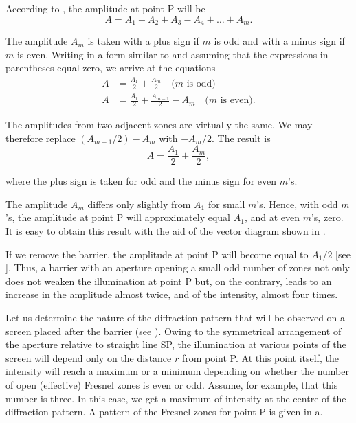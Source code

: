 According to , the amplitude at point P will be
\begin{equation}\label{eq:18_14}
	A = A_1 - A_2 + A_3 - A_4 + \ldots \pm A_m.
\end{equation}

\noindent
The amplitude $A_m$ is taken with a plus sign if $m$ is odd and with a minus sign if $m$ is even.
Writing  in a form similar to  and assuming that the expressions in parentheses equal zero, we arrive at the equations
\begin{align*}
	A &= \frac{A_1}{2} + \frac{A_m}{2} \quad \text{($m$ is odd)}\\
	A &= \frac{A_1}{2} + \frac{A_{m-1}}{2} - A_m \quad \text{($m$ is even)}.
\end{align*}

\noindent
The amplitudes from two adjacent zones are virtually the same.
We may therefore replace $(A_{m-1}/2)-A_m$ with $-A_m/2$.
The result is
\begin{equation}\label{eq:18_15}
	A = \frac{A_1}{2} \pm \frac{A_m}{2},
\end{equation}

\noindent
where the plus sign is taken for odd and the minus sign for even $m$'s.

The amplitude $A_m$ differs only slightly from $A_1$ for small $m$'s.
Hence, with odd $m$'s, the amplitude at point P will approximately equal $A_1$, and at even $m$'s, zero.
It is easy to obtain this result with the aid of the vector diagram shown in .

If we remove the barrier, the amplitude at point P will become equal to $A_1/2$ [see ].
Thus, a barrier with an aperture opening a small odd number of zones not only does not weaken the illumination at point P but, on the contrary, leads to an increase in the amplitude almost twice, and of the intensity, almost four
times.

Let us determine the nature of the diffraction pattern that will be observed on a screen placed after the barrier (see ).
Owing to the symmetrical arrangement of the aperture relative to straight line SP, the illumination at various points of the screen will depend only on the distance $r$ from point P.
At this point itself, the intensity will reach a maximum or a minimum depending on whether the number of open (effective) Fresnel zones is even or odd.
Assume, for example, that this number is three.
In this case, we get a maximum of intensity at the centre of the diffraction pattern.
A pattern of the Fresnel zones for point P is given in a.


